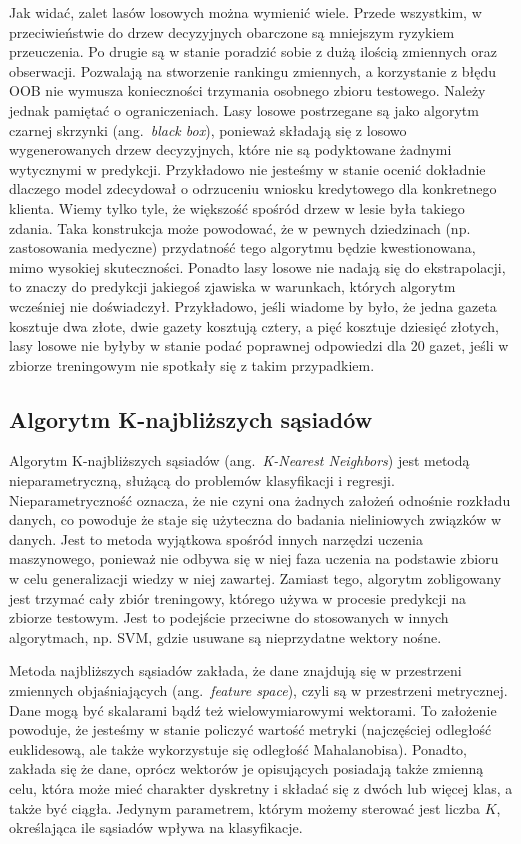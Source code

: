\documentclass[12pt,a4paper,twoside,openany]{book}
\begin{document}
Jak widać, zalet lasów losowych można wymienić wiele. Przede wszystkim, w przeciwieństwie do drzew decyzyjnych obarczone są mniejszym ryzykiem przeuczenia. Po drugie są w stanie poradzić sobie z dużą ilością zmiennych oraz obserwacji. Pozwalają na stworzenie rankingu zmiennych, a korzystanie z błędu OOB nie wymusza konieczności trzymania osobnego zbioru testowego. Należy jednak pamiętać o ograniczeniach. Lasy losowe postrzegane są jako algorytm czarnej skrzynki (ang.~\textit{black box}), ponieważ składają się z losowo wygenerowanych drzew decyzyjnych, które nie są podyktowane żadnymi wytycznymi w predykcji. Przykładowo nie jesteśmy w stanie ocenić dokładnie dlaczego model zdecydował o odrzuceniu wniosku kredytowego dla konkretnego klienta. Wiemy tylko tyle, że większość spośród drzew w lesie była takiego zdania. Taka konstrukcja może powodować, że w pewnych dziedzinach (np. zastosowania medyczne) przydatność tego algorytmu będzie kwestionowana, mimo wysokiej skuteczności. Ponadto lasy losowe nie nadają się do ekstrapolacji, to znaczy do predykcji jakiegoś zjawiska w warunkach, których algorytm wcześniej nie doświadczył. Przykładowo, jeśli wiadome by było, że jedna gazeta kosztuje dwa złote, dwie gazety kosztują cztery, a pięć kosztuje dziesięć złotych, lasy losowe nie byłyby w stanie podać poprawnej odpowiedzi dla 20 gazet, jeśli w zbiorze treningowym nie spotkały się z takim przypadkiem. 

\subsection{Algorytm K-najbliższych sąsiadów}

Algorytm K-najbliższych sąsiadów (ang.~\textit{K-Nearest Neighbors}) jest metodą nieparametryczną, służącą do problemów klasyfikacji i regresji. Nieparametryczność oznacza, że nie czyni ona żadnych założeń odnośnie rozkładu danych, co powoduje że staje się użyteczna do badania nieliniowych związków w danych. Jest to metoda wyjątkowa spośród innych narzędzi uczenia maszynowego, ponieważ nie odbywa się w niej faza uczenia na podstawie zbioru w celu generalizacji wiedzy w niej zawartej. Zamiast tego, algorytm zobligowany jest trzymać cały zbiór treningowy, którego używa w procesie predykcji na zbiorze testowym. Jest to podejście przeciwne do stosowanych w innych algorytmach, np. SVM, gdzie usuwane są nieprzydatne wektory nośne.

Metoda najbliższych sąsiadów zakłada, że dane znajdują się w przestrzeni zmiennych objaśniających (ang.~\textit{feature space}), czyli są w przestrzeni metrycznej. Dane mogą być skalarami bądź też wielowymiarowymi wektorami. To założenie powoduje, że jesteśmy w stanie policzyć wartość metryki (najczęściej odległość euklidesową, ale także wykorzystuje się odległość Mahalanobisa). Ponadto, zakłada się że dane, oprócz wektorów je opisujących posiadają także zmienną celu, która może mieć charakter dyskretny i składać się z dwóch lub więcej klas, a także być ciągła. Jedynym parametrem, którym możemy sterować jest liczba $K$, określająca ile sąsiadów wpływa na klasyfikacje. 
\end{document}
